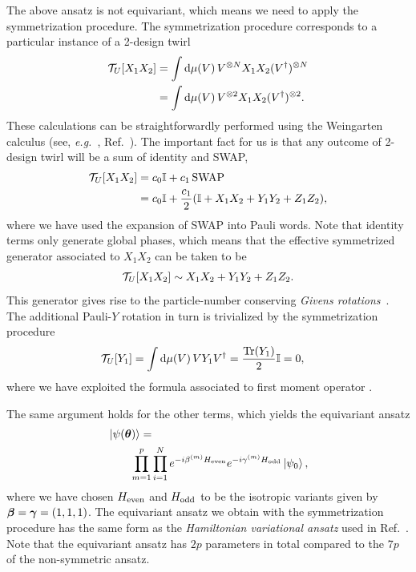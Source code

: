 \documentclass[a4paper,twocolumn,notitlepage,nofootinbib,superscriptaddress,floatfix]{revtex4-2}
\newcommand{\eg}{\textit{e.g.}\ }
\newcommand{\SWAP}{\ensuremath{\operatorname{SWAP}}}
\begin{document}
The above ansatz is not equivariant, which means we need to apply the symmetrization procedure. The symmetrization procedure corresponds to a particular instance of a 2-design twirl
\begin{align}
    \mathcal{T}_U[ X_{1} X_{2}] &= \int \mathrm{d} \mu(V) \, V^{\otimes N} X_{1} X_{2}(V^{\dagger})^{\otimes N} \\
     &= \int \mathrm{d} \mu(V) \, V^{\otimes 2} X_{1} X_{2}(V^{\dagger})^{\otimes 2}.
\end{align}
These calculations can be straightforwardly performed using the Weingarten calculus (see, \eg, Ref.~\cite{Pucha_a_2017}). The important fact for us is that any outcome of 2-design twirl will be a sum of identity and SWAP,
\begin{align}
    \calT_U[ X_{1} X_{2}] 
     &=  c_0\bbI +  c_1\SWAP\\
     &=  c_0\bbI + \frac{c_1}{2}(\bbI+X_{1} X_{2}+Y_{1} Y_{2}+Z_{1} Z_{2}),
\end{align}
where we have used the expansion of SWAP into Pauli words. Note that identity terms only generate global phases, which means that the effective symmetrized generator associated to $X_1 X_2$ can be taken to be
\begin{align}
    \mathcal{T}_U[ X_{1} X_{2}] \sim X_{1} X_{2}+Y_{1} Y_{2}+Z_{1} Z_{2}.
\end{align}
This generator gives rise to the particle-number conserving \emph{Givens rotations}~\cite{givensrotations}.
The additional Pauli-$Y$ rotation in turn is trivialized by the symmetrization procedure
\begin{align}
    \mathcal{T}_U[Y_{1}] &= \int \mathrm{d}\mu(V) \,  V Y_{1} V^{\dagger} = \frac{\operatorname{Tr}(Y_{1})}{2}\mathbb{I}=0,
\end{align}
where we have exploited the formula associated to first moment operator \cite{Kliesch_2021}.

The same argument holds for the other terms, which yields the 
equivariant ansatz
\begin{align}
\begin{split}
&\ket{\psi(\boldsymbol{\theta})}=\\
&\qquad \prod_{m=1}^{p}\prod_{i=1}^{N}e^{-i \beta^{(m)} H_{\rm even}}e^{-i \gamma^{(m)} H_{\rm odd} }\ket{\psi_0},
\end{split}
\end{align}
where we have chosen
$H_{\rm even}$ and $H_{\rm odd}$ to be the isotropic variants given by $\boldsymbol{\beta} =\boldsymbol{\gamma} = (1,1,1)$. The equivariant ansatz we obtain with the symmetrization procedure has the same form as the \emph{Hamiltonian variational ansatz} used in Ref.~\cite{Wiersema_2020,Ho_2019}. Note that the equivariant ansatz has $2p$ parameters in total compared to the $7p$ of the non-symmetric ansatz.
\end{document}
